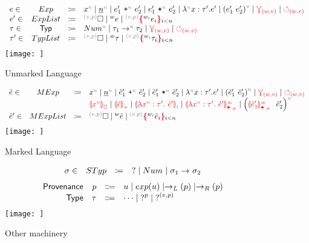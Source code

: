 \begin{figure}
    \[
    \begin{array}{lclll}
     \EMV \in & Exp & \coloneqq & 
        \var{x}
        \mid  \num 
        \mid \plus{\ELV_1}{\ELV_2} 
        \mid \mult{\ELV_1}{\ELV_2}
        \mid \lam{x}{\TLMV}{\ELV}
        \mid \app{\ELV_1}{\ELV_2}
        \mid \multiref
        \mid \uniref \\
     \ELV \in & ExpList & \coloneqq & 
        \ehole
        \mid \lexp{\EMV} 
        \mid \conflict{\EMV} \\
    \TMV \in & \Typ & \coloneqq & 
        \tnum 
        \mid \tarrow 
        \mid \multiref 
        \mid \uniref \\ 
    \TLMV \in & TypList & \coloneqq &
        \ehole
        \mid \lexp{\TMV}
        \mid \conflict{\TMV} \\
    \end{array}
    \]
    \centering
    \texttt{[image: ]}
    \caption{Unmarked Language}
    \label{fig:unmarked-language}
\end{figure}

\begin{figure}
    \[
    \begin{array}{lclll}
    \ECMV \in & MExp & \coloneqq &
        \var{x}
        \mid \num
        \mid \plus{\ELMV_1}{\ELMV_2}
        \mid \mult{\ELMV_1}{\ELMV_2}
        \mid \lam{x}{\TLMV}{\ELV}
        \mid \app{\ELMV_1}{\ELMV_2}
        \mid \multiref
        \mid \uniref \\ 
        & & & \ECFree{\var{x}} 
        \mid \incontype
        \mid \lamasc
        \mid \lamanamarr
        \mid \apsynmarr \\ 
     \ELMV \in & MExpList & \coloneqq &
        \ehole
        \mid \lexp{\ECMV}
        \mid \conflict{\ECMV} \\
    \end{array}
    \]
    \centering
    \texttt{[image: ]}
    \caption{Marked Language}
    \label{fig:marked-language}
\end{figure}

\begin{figure}
    \[
    \begin{array}{lclll}
    \sigma \in & STyp & \coloneqq & 
        \TUnknown
        \mid \tNum{}
        \mid \starrow \\
    \end{array}
    \]
    \judgbox{\graphErase{\TLMV} = \sigma}
    \[\begin{array}{rrcl}
        {\normalfont\textsf{Provenance}} & p & \Coloneqq & u \mid exp(u) \mid \rightarrow_L(p) \mid \rightarrow_R(p)\\
        {\normalfont\textsf{Type}}  & \tau  & \Coloneqq & \dots \mid \operatorname{?}^{p} \mid \operatorname{?}^{(v,p)}\\
    \end{array}\]
    \centering
    \texttt{[image: ]}
    \caption{Other machinery}
    \label{fig:marking-machinery}
\end{figure}


